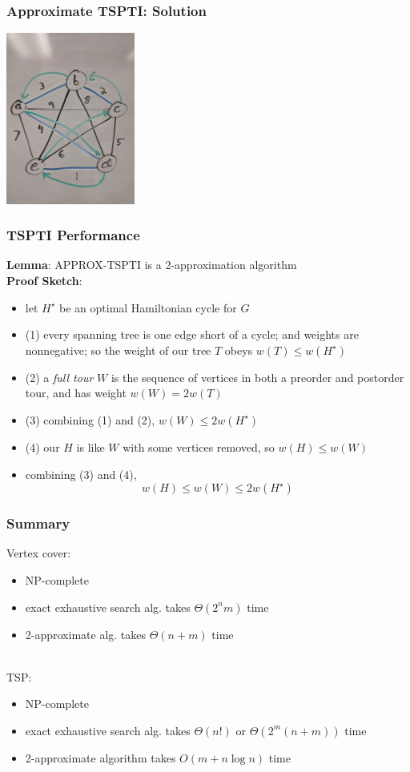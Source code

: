 \documentclass{beamer}
\newcommand{\stanza}{ \\~\ }
\begin{document}
  \begin{frame} \frametitle{Approximate TSPTI: Solution}
    \begin{center}
      \includegraphics[height=160pt]{13-tspti-output.jpg}
    \end{center}
  \end{frame}
  
  \begin{frame} \frametitle{TSPTI Performance}
  \textbf{Lemma}: APPROX-TSPTI is a 2-approximation algorithm \\
  \textbf{Proof Sketch}:
  \begin{itemize}
    \item let $H^\star$ be an optimal Hamiltonian cycle for $G$
    \item (1) every spanning tree is one edge short of a cycle; and weights are nonnegative;
      so the weight of our tree $T$ obeys $w(T) \leq w(H^\star)$
    \item (2) a \emph{full tour} $W$ is the sequence of vertices in both a preorder and postorder
      tour, and has weight $w(W) = 2 w(T)$
    \item (3) combining (1) and (2), $w(W) \leq 2 w(H^\star)$
    \item (4) our $H$ is like $W$ with some vertices removed, so $w(H) \leq w(W)$
    \item combining (3) and (4),
      \[ w(H) \leq w(W) \leq 2 w(H^\star) \]
  \end{itemize}
  \end{frame}
  
  \begin{frame} \frametitle{Summary}
  Vertex cover:
  \begin{itemize}
    \item NP-complete
    \item exact exhaustive search alg. takes $\Theta(2^n m)$ time
    \item 2-approximate alg. takes $\Theta(n+m)$ time \stanza
  \end{itemize}
  
  TSP:
  \begin{itemize}
    \item NP-complete
    \item exact exhaustive search alg. takes $\Theta(n!)$ or $\Theta(2^m(n+m))$ time
    \item 2-approximate algorithm takes $O(m + n \log n)$ time
  \end{itemize}
  \end{frame}
\end{document}

